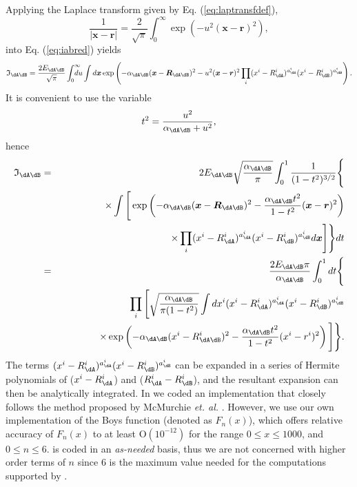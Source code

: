 Applying the Laplace transform given by Eq. (\ref{eq:laptransfdef}),
%
\begin{equation}\label{eq:laptransfdef}
   \frac{1}{|\boldsymbol{x}-\boldsymbol{r}|}=\frac{2}{\sqrt{\pi}}\int_0^{\infty}\exp\left(-u^2(\boldsymbol{x}-\boldsymbol{r})^2\right),
\end{equation}
%
into Eq. (\ref{eq:iabred}) yields
%
\begin{equation}
   \mathfrak{I}_{\dA\dB}=\frac{2E_{\dA\dB}}{\sqrt{\pi}}\int_0^{\infty}\!\!\!\!\!\!du\int d\boldsymbol{x}
   \exp\left(-\alpha_{\dA\dB}(\boldsymbol{x}-\boldsymbol{R}_{\dA\dB})^2-u^2(\boldsymbol{x}-\boldsymbol{r})^2\prod_i(x^i-R^i_{\dA})^{a^i_{\dA}}(x^i-R^i_{\dB})^{a^i_{\dB}}\right).
\end{equation}
%
It is convenient to use the variable
%
\begin{equation}
   t^2=\frac{u^2}{\alpha_{\dA\dB}+u^2},
\end{equation}
%
hence
%
\begin{eqnarray}
   \mathfrak{I}_{\dA\dB}&=&2E_{\dA\dB}\sqrt{\frac{\alpha_{\dA\dB}}{\pi}}
               \int_0^1\frac{1}{(1-t^2)^{3/2}}\Bigg\{\Bigg.\nonumber\\
   & &\qquad\times\int\Bigg[\Big.\exp\left(-\alpha_{\dA\dB}(\boldsymbol{x}-\boldsymbol{R}_{\dA\dB})^2
           -\frac{\alpha_{\dA\dB}t^2}{1-t^2}(\boldsymbol{x}-\boldsymbol{r})^2\right)\nonumber\\
   & & \qquad\qquad\times\prod_i(x^i-R_{\dA}^i)^{a_{\dA}^i}(x^i-R_{\dB}^i)^{a_{\dB}^i}d\boldsymbol{x}\Bigg.\Bigg]\Bigg.\Bigg\}dt\\
    &=&\frac{2E_{\dA\dB}\pi}{\alpha_{\dA\dB}}
        \int_0^1dt\Bigg\{\Bigg.\nonumber\\
    & &\prod_i\Bigg[\Bigg.\sqrt{\frac{\alpha_{\dA\dB}}{\pi(1-t^2)}}
        \int dx^i(x^i-R_{\dA}^i)^{a_{\dA}^i}(x^i-R_{\dB}^i)^{a_{\dB}^i}\nonumber\\
    & &\qquad\qquad\times\exp\left(-\alpha_{\dA\dB}(x^i-R^i_{\dA\dB})^2-\frac{\alpha_{\dA\dB}t^2}{1-t^2}(x^i-r^i)^2\right)\Bigg.\Bigg]\Bigg.\Bigg\}.
\end{eqnarray}
%
The terms $(x^i-R_{\dA}^i)^{a_{\dA}^i}(x^i-R_{\dB}^i)^{a_{\dB}^i}$ can be expanded in a series of Hermite polynomials of ($x^i-R^i_{\dA}$) and ($R^i_{\dA}-R^i_{\dB}$), and the resultant expansion can then be analytically integrated. In \DTK{} we coded an implementation that closely follows the method proposed by McMurchie \textit{et. al.} \cite{bib:mcmurchie1978}. However, we use our own implementation of the Boys function (denoted as $F_n(x)$), which offers relative accuracy of $F_n(x)$ to at least O$(10^{-12})$ for the range $0\leq x\leq1000$, and $0\leq n\leq6$. \DTK{} is coded in an \textit{as-needed} basis, thus we are not concerned with higher order terms of $n$ since 6 is the maximum value needed for the computations supported by \DTK.

